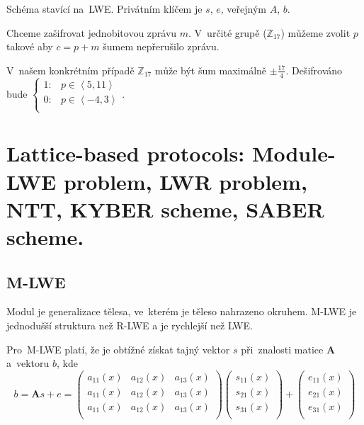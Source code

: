 Schéma stavící na~LWE.
Privátním klíčem je $s$, $e$, veřejným $A$, $b$.

Chceme zašifrovat jednobitovou zprávu $m$.
V~určité grupě ($\mathbb{Z}_{17}$) můžeme zvolit $p$ takové aby $c = p+m$ šumem nepřerušilo zprávu.

V~našem konkrétním případě $\mathbb{Z}_{17}$ může být šum maximálně $\pm \frac{17}{4}$.
Dešifrováno bude $\begin{cases}
1: & p \in \left<5, 11\right> \\
0: & p \in \left<-4, 3\right> \\
\end{cases}$.



\clearpage
\section{Lattice-based protocols: Module-LWE problem, LWR problem, NTT, KYBER scheme, SABER scheme.}

\subsection{M-LWE}

Modul je generalizace tělesa, ve~kterém je těleso\footnotemark{} nahrazeno okruhem\footnotemark{}.
M-LWE je jednodušší struktura než R-LWE a je rychlejší než LWE.

Pro~M-LWE platí, že je obtížné získat tajný vektor $s$ při~znalosti matice \textbf{A} a~vektoru $b$, kde
$$
b =
\textbf{A}s + e =
\left(\begin{matrix}
a_{11}(x) & a_{12}(x) & a_{13}(x) \\
a_{11}(x) & a_{12}(x) & a_{13}(x) \\
a_{11}(x) & a_{12}(x) & a_{13}(x) \\
\end{matrix}\right) \left(\begin{matrix}
s_{11}(x) \\ s_{21}(x) \\ s_{31}(x) \\
\end{matrix}\right) + \left(\begin{matrix}
e_{11}(x) \\ e_{21}(x) \\ e_{31}(x) \\
\end{matrix}\right)
$$

